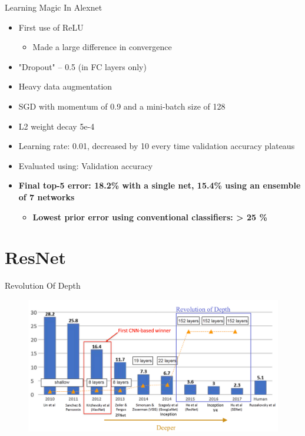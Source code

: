 \documentclass[serif, aspectratio=169]{beamer}
\begin{document}
\begin{frame}{Learning Magic In Alexnet}
	\begin{itemize}
		\item First use of ReLU
		\begin{itemize}
			\item Made a large difference in convergence
		\end{itemize}
		\item "Dropout" – 0.5 (in FC layers only)
		\item Heavy data augmentation
		\item SGD with momentum of 0.9 and a mini-batch size of 128
		\item L2 weight decay 5e-4
		\item Learning rate: 0.01, decreased by 10 every time validation accuracy plateaus
		\item Evaluated using: Validation accuracy
		\item \textbf{Final top-5 error: 18.2\% with a single net, 15.4\% using an ensemble of 7 networks}
		\begin{itemize}
			\item \textbf{Lowest prior error using conventional classifiers: > 25 \%}
		\end{itemize}
	\end{itemize}
\end{frame}

\section{ResNet}

\begin{frame}{Revolution Of Depth}
	\begin{figure}[htpb]
		\begin{center}
			\includegraphics[keepaspectratio, scale=0.25]{pic/resnet-chart}
		\end{center}
	\end{figure}
\end{frame}
\end{document}
